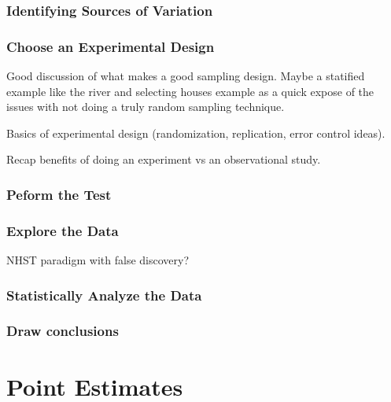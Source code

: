 \documentclass[
]{book}
\theoremstyle{definition}
\theoremstyle{definition}
\theoremstyle{definition}
\theoremstyle{remark}
\begin{document}
\hypertarget{identifying-sources-of-variation-1}{%
\subsection{Identifying Sources of Variation}\label{identifying-sources-of-variation-1}}

\hypertarget{choose-an-experimental-design-1}{%
\subsection{Choose an Experimental Design}\label{choose-an-experimental-design-1}}

Good discussion of what makes a good sampling design. Maybe a statified example like the river and selecting houses example as a quick expose of the issues with not doing a truly random sampling technique.

Basics of experimental design (randomization, replication, error control ideas).

Recap benefits of doing an experiment vs an observational study.

\hypertarget{peform-the-test-1}{%
\subsection{Peform the Test}\label{peform-the-test-1}}

\hypertarget{explore-the-data}{%
\subsection{Explore the Data}\label{explore-the-data}}

NHST paradigm with false discovery?

\hypertarget{statistically-analyze-the-data-1}{%
\subsection{Statistically Analyze the Data}\label{statistically-analyze-the-data-1}}

\hypertarget{draw-conclusions-1}{%
\subsection{Draw conclusions}\label{draw-conclusions-1}}

\hypertarget{point-estimates}{%
\chapter{Point Estimates}\label{point-estimates}}
\end{document}
